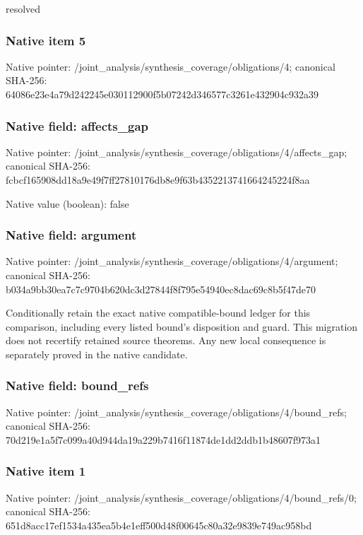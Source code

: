 \documentclass[10pt,a4paper]{article}
\begin{document}
\begingroup\raggedright\sloppy resolved\par\endgroup

\subsubsection{Native item 5}
Native pointer: /joint\_\allowbreak{}analysis/synthesis\_\allowbreak{}coverage/obligations/4; canonical SHA-256: 64086e23e4a79d242245e030112900f5b07242d346577c3261e432904c932a39

\subsubsection{Native field: affects\_\allowbreak{}gap}
Native pointer: /joint\_\allowbreak{}analysis/synthesis\_\allowbreak{}coverage/obligations/4/affects\_\allowbreak{}gap; canonical SHA-256: fcbcf165908dd18a9e49f7ff27810176db8e9f63b4352213741664245224f8aa

Native value (boolean): false

\subsubsection{Native field: argument}
Native pointer: /joint\_\allowbreak{}analysis/synthesis\_\allowbreak{}coverage/obligations/4/argument; canonical SHA-256: b034a9bb30ea7c7c9704b620dc3d27844f8f795e54940ec8dac69c8b5f47de70

\begingroup\raggedright\sloppy Conditionally retain the exact native compatible-bound ledger for this comparison,\allowbreak{} including every listed bound's disposition and guard. This migration does not recertify retained source theorems. Any new local consequence is separately proved in the native candidate.\par\endgroup

\subsubsection{Native field: bound\_\allowbreak{}refs}
Native pointer: /joint\_\allowbreak{}analysis/synthesis\_\allowbreak{}coverage/obligations/4/bound\_\allowbreak{}refs; canonical SHA-256: 70d219e1a5f7c099a40d944da19a229b7416f11874de1dd2ddb1b48607f973a1

\subsubsection{Native item 1}
Native pointer: /joint\_\allowbreak{}analysis/synthesis\_\allowbreak{}coverage/obligations/4/bound\_\allowbreak{}refs/0; canonical SHA-256: 651d8acc17ef1534a435ea5b4e1eff500d48f00645c80a32e9839e749ac958bd
\end{document}
